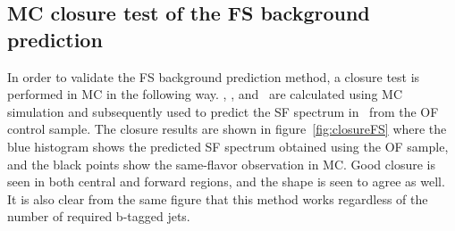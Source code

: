 \clearpage

\subsection{MC closure test of the FS background prediction}
\label{ssec:closureFS}
In order to validate the FS background prediction method,
a closure test is performed in MC in the following way.
\rsfof, \rmue, and \rt\ are calculated using MC simulation
and subsequently used to predict the SF spectrum in \mll\ from the OF control sample.
The closure results are shown in figure~\ref{fig:closureFS}
where the blue histogram shows the predicted SF spectrum obtained using the OF sample,
and the black points show the same-flavor observation in MC.
Good closure is seen in both central and forward regions,
and the shape is seen to agree as well.
It is also clear from the same figure that this method
works regardless of the number of required b-tagged jets.

